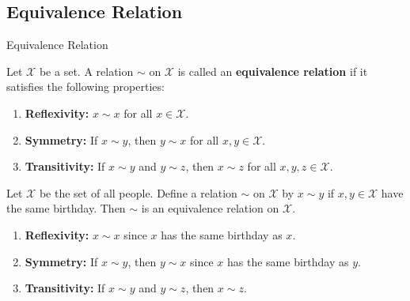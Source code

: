 \documentclass[xcolor={usenames,dvipsnames}]{beamer}
\begin{document}
    \subsection{Equivalence Relation}
    \begin{frame}{Equivalence Relation}
        \begin{definition}
            Let $\mathcal{X}$ be a set. A relation $\sim$ on $\mathcal{X}$ is called an \textbf{equivalence relation} if it satisfies the following properties:
            \begin{enumerate}
                \item \textbf{Reflexivity:} $x \sim x$ for all $x \in \mathcal{X}$.\pause
                \item \textbf{Symmetry:} If $x \sim y$, then $y \sim x$ for all $x,y \in \mathcal{X}$.\pause
                \item \textbf{Transitivity:} If $x \sim y$ and $y \sim z$, then $x \sim z$ for all $x,y,z \in \mathcal{X}$.
            \end{enumerate}
        \end{definition}
        
        \pause\begin{example}
            Let $\mathcal{X}$ be the set of all people. Define a relation $\sim$ on $\mathcal{X}$ by $x \sim y$ if $x,y \in \mathcal{X}$ have the same birthday. 
            Then $\sim$ is an equivalence relation on $\mathcal{X}$.
            \begin{enumerate}
                \item \textbf{Reflexivity:} $x \sim x$ since $x$ has the same birthday as $x$.\pause
                \item \textbf{Symmetry:} If $x \sim y$, then $y \sim x$ since $x$ has the same birthday as $y$.\pause
                \item \textbf{Transitivity:} If $x \sim y$ and $y \sim z$, then $x \sim z$.
            \end{enumerate}
        \end{example}
    \end{frame}
\end{document}
